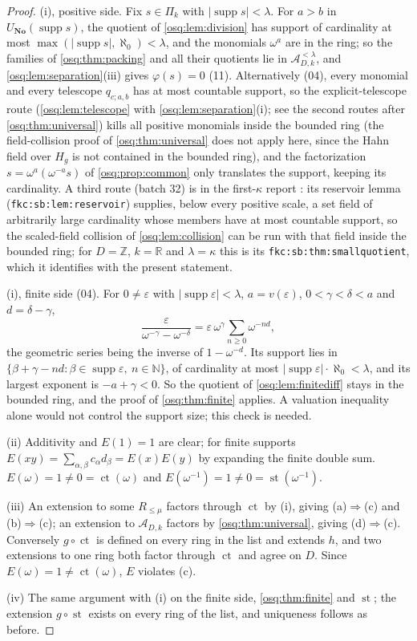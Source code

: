 \documentclass[11pt,letterpaper]{article}
\numberwithin{equation}{section}
\theoremstyle{definition}
\theoremstyle{remark}
\theoremstyle{plain}
\newcommand{\No}{\mathbf{No}}
\newcommand{\Z}{\mathbb Z}
\newcommand{\R}{\mathbb R}
\newcommand{\N}{\mathbb N}
\newcommand{\A}{\mathcal A}          %
\newcommand{\ct}{\operatorname{ct}}
\newcommand{\st}{\operatorname{st}}
\newcommand{\supp}{\operatorname{supp}}
\begin{document}
\begin{proof}
(i), positive side. Fix $s\in\Pi_k$ with $|\supp s|<\lambda$. For $a>b$ in $U_{\No}(\supp s)$,
the quotient of \cref{osq:lem:division} has support of cardinality at most
$\max(|\supp s|,\aleph_0)<\lambda$, and the monomials $\omega^a$ are in the ring; so the
families of \cref{osq:thm:packing} and all their quotients lie in $\A^{<\lambda}_{D,k}$, and
\cref{osq:lem:separation}(iii) gives $\varphi(s)=0$ (11). Alternatively (04), every
monomial and every telescope $q_{c;a,b}$ has at most countable support, so the explicit-telescope
route (\cref{osq:lem:telescope} with \cref{osq:lem:separation}(i); see the second routes after
\cref{osq:thm:universal}) kills all positive monomials inside the bounded ring (the
field-collision proof of \cref{osq:thm:universal} does not apply here, since the Hahn field over
$H_g$ is not contained in the bounded ring), and the factorization
$s=\omega^a(\omega^{-a}s)$ of \cref{osq:prop:common} only translates the support, keeping
its cardinality. A third route (batch 32) is in the first-$\kappa$ report \cite{RepoFKC}: its reservoir lemma
(\nolinkurl{fkc:sb:lem:reservoir}) supplies, below every positive scale, a set field of arbitrarily large cardinality
whose members have at most countable support, so the scaled-field collision of \cref{osq:lem:collision} can be run
with that field inside the bounded ring; for $D=\Z$, $k=\R$ and $\lambda=\kappa$ this is its
\nolinkurl{fkc:sb:thm:smallquotient}, which it identifies with the present statement.

(i), finite side (04). For $0\ne\varepsilon$ with $|\supp\varepsilon|<\lambda$,
$a=v(\varepsilon)$, $0<\gamma<\delta<a$ and $d=\delta-\gamma$,
\[
 \frac{\varepsilon}{\omega^{-\gamma}-\omega^{-\delta}}=\varepsilon\,\omega^{\gamma}\sum_{n\ge0}\omega^{-nd},
\]
the geometric series being the inverse of $1-\omega^{-d}$. Its support lies in
$\{\beta+\gamma-nd:\beta\in\supp\varepsilon,\ n\in\N\}$, of cardinality at most
$|\supp\varepsilon|\cdot\aleph_0<\lambda$, and its largest exponent is $-a+\gamma<0$. So the
quotient of \cref{osq:lem:finitediff} stays in the bounded ring, and the proof of
\cref{osq:thm:finite} applies. A valuation inequality alone would not control the support
size; this check is needed.

(ii) Additivity and $E(1)=1$ are clear; for finite supports
$E(xy)=\sum_{\alpha,\beta}c_\alpha d_\beta=E(x)E(y)$ by expanding the finite double sum.
$E(\omega)=1\ne0=\ct(\omega)$ and $E(\omega^{-1})=1\ne0=\st(\omega^{-1})$.

(iii) An extension to some $R_{\le\mu}$ factors through $\ct$ by (i), giving (a)$\Rightarrow$(c)
and (b)$\Rightarrow$(c); an extension to $\A_{D,k}$ factors by \cref{osq:thm:universal}, giving
(d)$\Rightarrow$(c). Conversely $g\circ\ct$ is defined on every ring in the list and extends
$h$, and two extensions to one ring both factor through $\ct$ and agree on $D$. Since
$E(\omega)=1\ne\ct(\omega)$, $E$ violates (c).

(iv) The same argument with (i) on the finite side, \cref{osq:thm:finite} and $\st$; the
extension $g\circ\st$ exists on every ring of the list, and uniqueness follows as before.
\end{proof}
\end{document}
